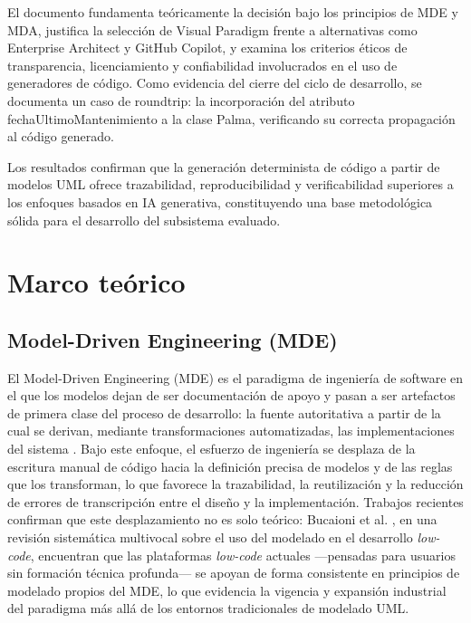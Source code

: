 \documentclass[11pt,a4paper]{article}
\begin{document}
El documento fundamenta teóricamente la decisión bajo los principios de MDE y MDA, justifica la selección de Visual Paradigm frente a alternativas como Enterprise Architect y GitHub Copilot, y examina los criterios éticos de transparencia, licenciamiento y confiabilidad involucrados en el uso de generadores de código. Como evidencia del cierre del ciclo de desarrollo, se documenta un caso de roundtrip: la incorporación del atributo fechaUltimoMantenimiento a la clase Palma, verificando su correcta propagación al código generado.

Los resultados confirman que la generación determinista de código a partir de modelos UML ofrece trazabilidad, reproducibilidad y verificabilidad superiores a los enfoques basados en IA generativa, constituyendo una base metodológica sólida para el desarrollo del subsistema evaluado.

\newpage
\tableofcontents
\newpage


\section{Marco teórico}
\label{sec:marco-teorico}

\subsection{Model-Driven Engineering (MDE)}
\label{sec:mde}
El Model-Driven Engineering (MDE) es el paradigma de ingeniería de software en el que los
modelos dejan de ser documentación de apoyo y pasan a ser artefactos de primera clase del
proceso de desarrollo: la fuente autoritativa a partir de la cual se derivan, mediante
transformaciones automatizadas, las implementaciones del sistema \cite{schmidt2006}. Bajo este
enfoque, el esfuerzo de ingeniería se desplaza de la escritura manual de código hacia la definición precisa de modelos y de las reglas que los transforman, lo que favorece la
trazabilidad, la reutilización y la reducción de errores de transcripción entre el diseño y la
implementación. Trabajos recientes confirman que este desplazamiento no es solo teórico:
Bucaioni et al. \cite{bucaioni2022}, en una revisión sistemática multivocal sobre el uso del
modelado en el desarrollo \textit{low-code}, encuentran que las plataformas \textit{low-code}
actuales —pensadas para usuarios sin formación técnica profunda— se apoyan de forma
consistente en principios de modelado propios del MDE, lo que evidencia la vigencia y
expansión industrial del paradigma más allá de los entornos tradicionales de modelado UML.
\end{document}

